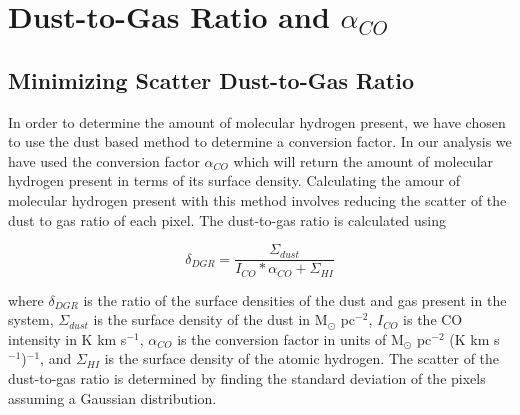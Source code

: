 \chapter{Dust-to-Gas Ratio and $\alpha_{CO}$}

\section{Minimizing Scatter Dust-to-Gas Ratio}

In order to determine the amount of molecular hydrogen present, we have chosen to use the dust based method to determine a conversion factor.  In our analysis we have used the conversion factor $\alpha_{CO}$ which will return the amount of molecular hydrogen present in terms of its surface density.  Calculating the amour of molecular hydrogen present with this method involves reducing the scatter of the dust to gas ratio of each pixel.  The dust-to-gas ratio is calculated using

\begin{equation}\label{dgr}
  \delta_{DGR} = \frac{\Sigma_{dust}}{I_{CO}*\alpha_{CO} + \Sigma_{HI}}
\end{equation}

where $\delta_{DGR}$ is the ratio of the surface densities of the dust and gas present in the system, $\Sigma_{dust}$ is the surface density of the dust in M$_\odot$ pc$^{-2}$, $I_{CO}$ is the CO intensity in K km s$^{-1}$, $\alpha_{CO}$ is the conversion factor in units of M$_\odot$ pc$^{-2}$ (K km s$^{-1}$)$^{-1}$, and $\Sigma_{HI}$ is the surface density of the atomic hydrogen.  The scatter of the dust-to-gas ratio is determined by finding the standard deviation of the pixels assuming a Gaussian distribution.  

